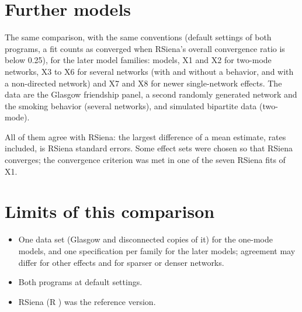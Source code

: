 \section{Further models}\label{sec:benchextra}

The same comparison, with the same conventions (default settings of both programs, a fit counts as converged when RSiena's overall convergence ratio is below 0.25), for the later model families: \benchnextra{} models, X1 and X2 for two-mode networks, X3 to X6 for several networks (with and without a behavior, and with a non-directed network) and X7 and X8 for newer single-network effects. The data are the Glasgow friendship panel, a second randomly generated network and the smoking behavior (several networks), and simulated bipartite data (two-mode).

All of them agree with RSiena: the largest difference of a mean estimate, rates included, is \benchxmaxdiff{} RSiena standard errors. Some effect sets were chosen so that RSiena converges; the convergence criterion was met in one of the seven RSiena fits of X1.

\section{Limits of this comparison}

\begin{itemize}
\item One data set (Glasgow and disconnected copies of it) for the one-mode models, and one specification per family for the later models; agreement may differ for other effects and for sparser or denser networks.
\item Both programs at default settings.
\item RSiena \benchrsiena{} (R \benchrver) was the reference version.
\end{itemize}
